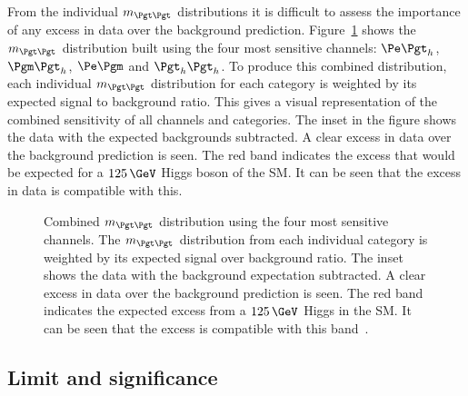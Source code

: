 From the individual $m_{\Pgt\Pgt}$ distributions it is difficult to assess the
importance of any excess in data over the background prediction.
Figure~\ref{fig:combinedmass} shows the $m_{\Pgt\Pgt}$ distribution built using
the four most sensitive channels: $\etau$, $\mutau$, $\emu$ and $\tautau$. To
produce this combined distribution, each individual $m_{\Pgt\Pgt}$ distribution
for each category is weighted by its expected signal to background ratio. This
gives a visual representation of the combined sensitivity of all channels and
categories. The inset in the figure shows the data with the expected backgrounds
subtracted. A clear excess in data over the background prediction is seen. The
red band indicates the excess that would be expected for a $125\,\GeV$ Higgs
boson of the \ac{SM}. It can be seen that the excess in data is compatible with
this.

\begin{figure}[h!]
\caption[Combined $m_{\Pgt\Pgt}$ distribution using the four most sensitive
channels.]{Combined $m_{\Pgt\Pgt}$ distribution using the four most sensitive
channels. The $m_{\Pgt\Pgt}$ distribution from each individual category is
weighted by its expected signal over background ratio. The inset shows the data
with the background expectation subtracted. A clear excess in data over the
background prediction is seen. The red band indicates the expected excess from a
$125\,\GeV$ Higgs in the \ac{SM}. It can be seen that the excess is compatible
with this band~\cite{HIG-13-004}. }
\label{fig:combinedmass}
\end{figure}


\subsection{Limit and significance}
\label{sec:significance}

